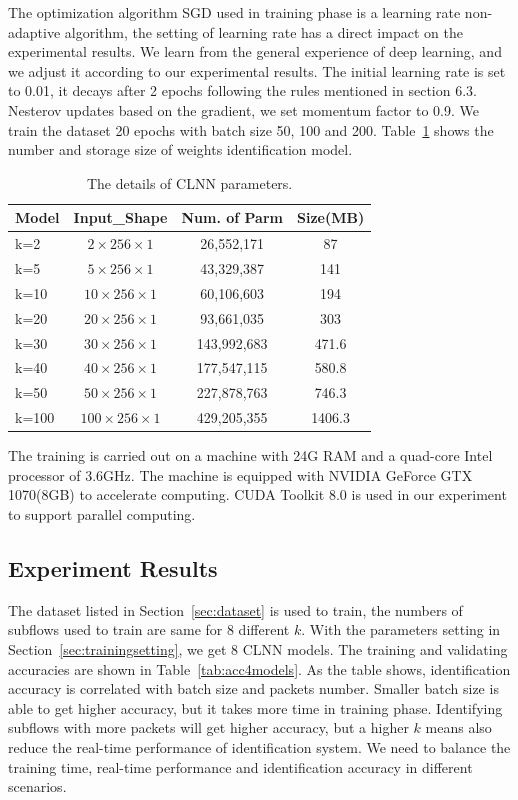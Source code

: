 \documentclass[conference]{IEEEtran}
\begin{document}
The optimization algorithm SGD used in training phase is a learning rate non-adaptive algorithm, the setting of learning rate has a direct impact on the experimental results. We learn from the general experience of deep learning, and we adjust it according to our experimental results. The initial learning rate is set to 0.01, it decays after 2 epochs following the rules mentioned in section 6.3. Nesterov updates based on the gradient, we set momentum factor to 0.9. We train the dataset 20 epochs with batch size 50, 100 and 200. Table~\ref{tab:params} shows the number and storage size of weights identification model.
\begin{table}
  \caption{The details of CLNN parameters.}
  \label{tab:params}
  \centering
  \begin{tabular}{l c c c}
    \hline
    \textbf{Model} & \textbf{Input\_Shape} & \textbf{Num. of Parm}&\textbf{Size(MB)}\\
    \hline
    k=2      & ${2 \times 256 \times 1}$  & 26,552,171  &87  \\
    k=5      & ${5 \times 256 \times 1}$  & 43,329,387  &141  \\
    k=10      & ${10 \times 256 \times 1}$  & 60,106,603  &194  \\
    k=20      & ${20 \times 256 \times 1}$  & 93,661,035  &303 \\
    k=30     & ${30 \times 256 \times 1}$  & 143,992,683  &471.6  \\
    k=40     & ${40 \times 256 \times 1}$  & 177,547,115  &580.8 \\
    k=50     & ${50 \times 256 \times 1}$  & 227,878,763  &746.3  \\
    k=100    & ${100 \times 256 \times 1}$  & 429,205,355  &1406.3  \\
    \hline
  \end{tabular}
\end{table}

The training is carried out on a machine with 24G RAM and a quad-core Intel processor of 3.6GHz. The machine is equipped with NVIDIA GeForce GTX 1070(8GB) to accelerate computing. CUDA Toolkit 8.0 is used in our experiment to support parallel computing.


\subsection{Experiment Results}
\label{sec:experimentresults}
The dataset listed in Section~\ref{sec:dataset} is used to train, the numbers of subflows used to train are same for 8 different $k$. With the parameters setting in Section~\ref{sec:trainingsetting}, we get 8 CLNN models. The training and validating accuracies are shown in Table~\ref{tab:acc4models}. As the table shows, identification accuracy is correlated with batch size and packets number. Smaller batch size is able to get higher accuracy, but it takes more time in training phase. Identifying subflows with more packets will get higher accuracy, but a higher $k$ means also reduce the real-time performance of identification system. We need to balance the training time, real-time performance and identification accuracy in different scenarios. 
\end{document}

